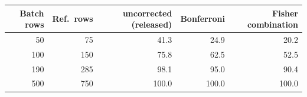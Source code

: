 \begin{tabular}{rrrrr}
\toprule
\textbf{Batch rows} & \textbf{Ref.\ rows} & \textbf{uncorrected (released)} & \textbf{Bonferroni} & \textbf{Fisher combination} \\
\midrule
50 & 75 & 41.3 & 24.9 & 20.2 \\
100 & 150 & 75.8 & 62.5 & 52.5 \\
190 & 285 & 98.1 & 95.0 & 90.4 \\
500 & 750 & 100.0 & 100.0 & 100.0 \\
\bottomrule
\end{tabular}
